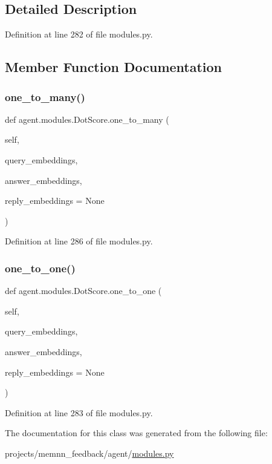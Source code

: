 \subsection{Detailed Description}


Definition at line 282 of file modules.\+py.



\subsection{Member Function Documentation}
\mbox{\label{classagent_1_1modules_1_1DotScore_aa997866489a5019a9b19b702b0e48d39}} 
\subsubsection{\texorpdfstring{one\+\_\+to\+\_\+many()}{one\_to\_many()}}
{\footnotesize\ttfamily def agent.\+modules.\+Dot\+Score.\+one\+\_\+to\+\_\+many (\begin{DoxyParamCaption}\item[{}]{self,  }\item[{}]{query\+\_\+embeddings,  }\item[{}]{answer\+\_\+embeddings,  }\item[{}]{reply\+\_\+embeddings = {\ttfamily None} }\end{DoxyParamCaption})}



Definition at line 286 of file modules.\+py.

\mbox{\label{classagent_1_1modules_1_1DotScore_adb19e68bfefc47730309975dbc2c9ab3}} 
\subsubsection{\texorpdfstring{one\+\_\+to\+\_\+one()}{one\_to\_one()}}
{\footnotesize\ttfamily def agent.\+modules.\+Dot\+Score.\+one\+\_\+to\+\_\+one (\begin{DoxyParamCaption}\item[{}]{self,  }\item[{}]{query\+\_\+embeddings,  }\item[{}]{answer\+\_\+embeddings,  }\item[{}]{reply\+\_\+embeddings = {\ttfamily None} }\end{DoxyParamCaption})}



Definition at line 283 of file modules.\+py.



The documentation for this class was generated from the following file\+:\begin{DoxyCompactItemize}
\item 
projects/memnn\+\_\+feedback/agent/\hyperlink{projects_2memnn__feedback_2agent_2modules_8py}{modules.\+py}\end{DoxyCompactItemize}
